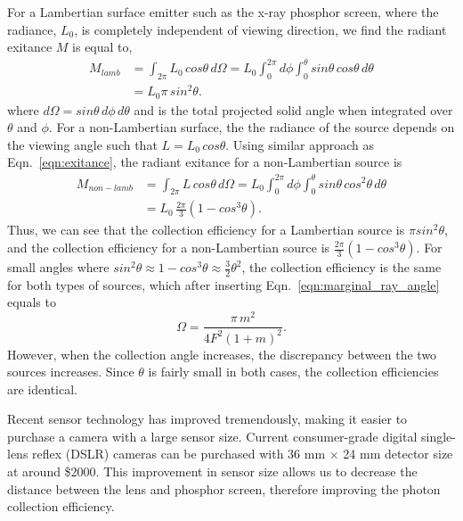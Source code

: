 For a Lambertian surface emitter such as the x-ray phosphor screen, where the radiance, $L_0$, is completely independent of viewing direction, we find the radiant exitance $M$ is equal to,
%
\begin{equation}
\begin{aligned}
M_{lamb} & = \int_{2\pi} L_0 \, cos \theta \, d\Omega = L_0 \int_0^{2 \pi} d\phi \int_0^{\theta} sin \theta \, cos \theta \, d\theta \\
  & = L_0 \pi \, sin^2 \theta.
\label{eqn:exitance}
\end{aligned}
\end{equation}
%
where $d\Omega = sin \theta \, d\phi \, d\theta$ and is the total projected solid angle when integrated over $\theta$ and $\phi$.  For a non-Lambertian surface, the the radiance of the source depends on the viewing angle such that $L = L_0 \, cos \theta $.  Using similar approach as Eqn.~\ref{eqn:exitance}, the radiant exitance for a non-Lambertian source is
%
\begin{equation}
\begin{aligned}
M_{non-lamb} & = \int_{2 \pi} L \, cos\theta \, d\Omega = L_0 \int_0^{2 \pi} d\phi \int_0^{\theta} sin\theta \, cos^2 \theta \, d\theta \\
    & = L_0 \, \frac{2 \pi}{3} (1 - cos^3 \theta ).
\end{aligned}
\end{equation}
%
Thus, we can see that the collection efficiency for a Lambertian source is $\pi sin^2 \theta$, and the collection efficiency for a non-Lambertian source is $\frac{2 \pi}{3} (1-cos^3 \theta)$.  For small angles where $sin^2 \theta \approx 1 - cos^3 \theta \approx \frac{3}{2}\theta^2$, the collection efficiency is the same for both types of sources, which after inserting Eqn.~\ref{eqn:marginal_ray_angle} equals to
\begin{equation}
\Omega = \frac{\pi \, m^2}{4 F^2 (1 + m)^2}.
\end{equation}
However, when the collection angle increases, the discrepancy between the two sources increases.  Since $\theta$ is fairly small in both cases, the collection efficiencies are identical.

Recent sensor technology has improved tremendously, making it easier to purchase a camera with a large sensor size.  Current consumer-grade digital single-lens reflex (DSLR) cameras can be purchased with 36 mm $\times$ 24 mm detector size at around \$2000.  This improvement in sensor size allows us to decrease the distance between the lens and phosphor screen, therefore improving the photon collection efficiency.

